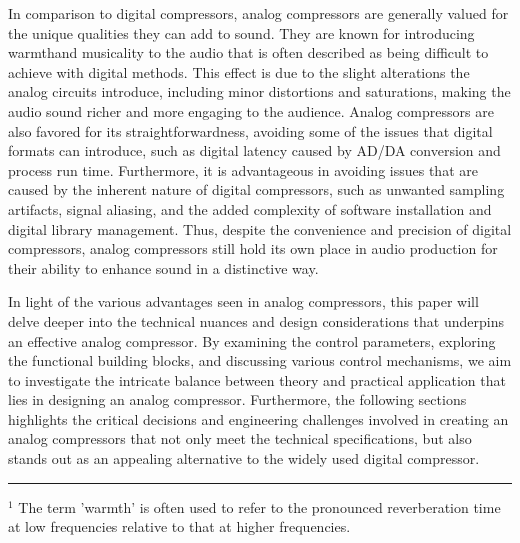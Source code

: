 \documentclass[10pt]{article}
\begin{document}
\begin{multicols*}{2}
            In comparison to digital compressors, analog compressors are generally valued for the unique qualities they can add to sound. They are known for introducing warmth\footnotemark and musicality to the audio that is often described as being difficult to achieve with digital methods. \cite{sos-warmth} This effect is due to the slight alterations the analog circuits introduce, including minor distortions and saturations, making the audio sound richer and more engaging to the audience. Analog compressors are also favored for its straightforwardness, avoiding some of the issues that digital formats can introduce, such as digital latency caused by AD/DA conversion and process run time. Furthermore, it is advantageous in avoiding issues that are caused by the inherent nature of digital compressors, such as unwanted sampling artifacts, signal aliasing, and the added complexity of software installation and digital library management. Thus, despite the convenience and precision of digital compressors, analog compressors still hold its own place in audio production for their ability to enhance sound in a distinctive way.\par
            In light of the various advantages seen in analog compressors, this paper will delve deeper into the technical nuances and design considerations that underpins an effective analog compressor. By examining the control parameters, exploring the functional building blocks, and discussing various control mechanisms, we aim to investigate the intricate balance between theory and practical application that lies in designing an analog compressor. Furthermore, the following sections highlights the critical decisions and engineering challenges involved in creating an analog compressors that not only meet the technical specifications, but also stands out as an appealing alternative to the widely used digital compressor.

            \vspace{2cm}

            \par\noindent\rule{\linewidth}{0.5pt}
            \begin{minipage}[b]{\linewidth}
                \vspace{2pt}
                \footnotesize{$^1$ The term 'warmth' is often used to refer to the pronounced reverberation time at low frequencies relative to that at higher frequencies.} \cite{britanica-warmth}
            \end{minipage}\hfill


\end{multicols*}
\end{document}
